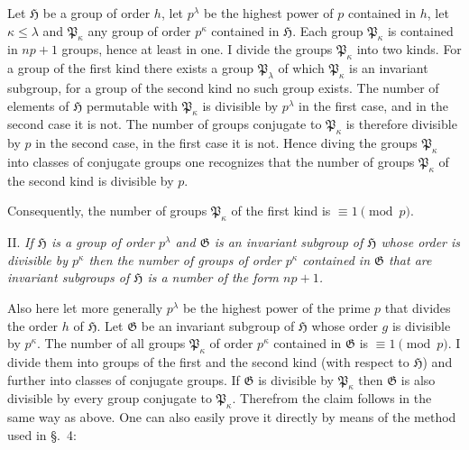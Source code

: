 \documentclass[a5paper,12pt]{article}
\let\fr\mathfrak
\newcommand{\CG}{\fr{G}}
\newcommand{\CH}{\fr{H}}
\newcommand{\CP}{\fr{P}}
\newcommand{\?}{{\color{blue}${}^{(?)}$}}
\newcounter{origpagecounter}{}
\newcommand{\origpagebreak}{\mark{\arabic{origpagecounter}}\addtocounter{origpagecounter}{1}\mark{\arabic{origpagecounter}}}
\begin{document}

Let $\CH$ be a group of order $h$,
let $p^\lambda$ be the highest power of $p$ contained in $h$,
let $\kappa \leq \lambda$
and
$\CP_\kappa$ any group of order $p^\kappa$
contained in $\CH$.
%
%
Each group $\CP_\kappa$ is contained in $n p + 1$ groups,
hence at least in one.
%
%
I divide the groups $\CP_\kappa$
into two kinds.
%
%
For a group of the first kind
there exists
a group $\CP_\lambda$
of which $\CP_\kappa$ is an invariant subgroup,
for a group of the second kind
no such group exists.
%
%
The number of elements of $\CH$
permutable with $\CP_\kappa$
is divisible by $p^\lambda$ in the first case,
and
in the second case it is not.
%
%
The number of groups
conjugate to $\CP_\kappa$ is therefore
divisible by $p$ in the second case,
in the first case it is not.
%
%
Hence diving the groups $\CP_\kappa$
into classes of conjugate groups
one recognizes
that the number of groups $\CP_\kappa$
of the second kind
is divisible by $p$.
%
%
\origpagebreak
%
%
Consequently,
the number of groups $\CP_\kappa$ of the first kind
is $\equiv 1 \pmod{p}$.


II.
%
\label{t:5-2}
%
\emph{ %
If $\CH$ is a group of order $p^\lambda$
and $\CG$ is an invariant subgroup of $\CH$
whose order is divisible by $p^\kappa$
then the number of groups of order $p^\kappa$
contained in $\CG$
that are invariant subgroups of $\CH$
is
a number of the form $n p + 1$.
}


Also here let more generally
$p^\lambda$ be the highest power of the prime $p$
that divides the order $h$ of $\CH$.
%
%
Let $\CG$ be an invariant subgroup of $\CH$
whose order $g$ is divisible by $p^\kappa$.
%
%
The number of all groups $\CP_\kappa$ of order $p^\kappa$
contained in $\CG$
is $\equiv 1 \pmod{p}$.
%
%
I divide them into groups of the first and the second kind
(with respect to $\CH$)
and
further
into classes of conjugate groups.
%
%
If $\CG$ is divisible by $\CP_\kappa$
then
$\CG$ is also divisible by every group
conjugate to $\CP_\kappa$.
%
%
Therefrom
the claim follows in the same way as above.
%
%
One can also easily prove it directly
by means of the method
used in \S.~4:

\end{document}
